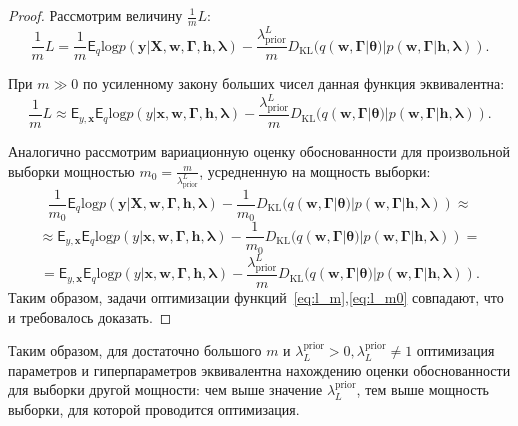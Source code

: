 \begin{proof}
Рассмотрим величину  $\frac{1}{m}L$: \\
\begin{equation}
\label{eq:l_m}
    \frac{1}{m}L = \frac{1}{m}\mathsf{E}_q \text{log}p(\mathbf{y}|\mathbf{X},  \mathbf{w}, \boldsymbol{\Gamma}, \mathbf{h}, \boldsymbol{\lambda})-\frac{\lambda_\text{prior}^L}{m}D_\text{KL}(q(\mathbf{w}, \boldsymbol{\Gamma}|\boldsymbol{\theta})|p(\mathbf{w},\boldsymbol{\Gamma}|\mathbf{h}, \boldsymbol{\lambda})).
\end{equation}

При $m \gg 0$ по усиленному закону больших чисел данная функция эквивалентна:
\[
    \frac{1}{m}L \approx  \mathsf{E}_{y, \mathbf{x}} \mathsf{E}_{q} \text{log}p(y|\mathbf{x}, \mathbf{w}, \boldsymbol{\Gamma}, \mathbf{h}, \boldsymbol{\lambda}) -\frac{\lambda_\text{prior}^L}{m}D_\text{KL}(q(\mathbf{w}, \boldsymbol{\Gamma}|\boldsymbol{\theta})|p(\mathbf{w},\boldsymbol{\Gamma}|\mathbf{h}, \boldsymbol{\lambda})).
\]

Аналогично рассмотрим вариационную оценку обоснованности для произвольной выборки мощностью $m_0 = \frac{m}{\lambda_\text{prior}^L}$, усредненную на мощность выборки:
\begin{equation}
\label{eq:l_m0}
    \frac{1}{m_0}\mathsf{E}_q \text{log}p(\mathbf{y}|\mathbf{X},  \mathbf{w}, \boldsymbol{\Gamma}, \mathbf{h}, \boldsymbol{\lambda})-\frac{1}{m_0}D_\text{KL}(q(\mathbf{w}, \boldsymbol{\Gamma}|\boldsymbol{\theta})|p(\mathbf{w},\boldsymbol{\Gamma}|\mathbf{h}, \boldsymbol{\lambda})) \approx
\end{equation}
\[
\approx  \mathsf{E}_{y, \mathbf{x}} \mathsf{E}_{q} \text{log}p(y|\mathbf{x}, \mathbf{w}, \boldsymbol{\Gamma}, \mathbf{h}, \boldsymbol{\lambda}) -\frac{1}{m_0}D_\text{KL}(q(\mathbf{w}, \boldsymbol{\Gamma}|\boldsymbol{\theta})|p(\mathbf{w},\boldsymbol{\Gamma}|\mathbf{h}, \boldsymbol{\lambda})) = 
\]
\[
= \mathsf{E}_{y, \mathbf{x}} \mathsf{E}_{q} \text{log}p(y|\mathbf{x}, \mathbf{w}, \boldsymbol{\Gamma}, \mathbf{h}, \boldsymbol{\lambda}) -\frac{\lambda_\text{prior}^L}{m}D_\text{KL}(q(\mathbf{w}, \boldsymbol{\Gamma}|\boldsymbol{\theta})|p(\mathbf{w},\boldsymbol{\Gamma}|\mathbf{h}, \boldsymbol{\lambda})).
\]
Таким образом, задачи оптимизации функций~\eqref{eq:l_m},\eqref{eq:l_m0} совпадают, что и требовалось доказать.
\end{proof}
Таким образом, для достаточно большого $m$ и $\lambda^{\text{prior}}_L>0, \lambda^{\text{prior}}_L \neq 1$ оптимизация параметров и гиперпараметров эквивалентна нахождению оценки обоснованности для выборки другой мощности: чем выше значение $ \lambda^{\text{prior}}_L$, тем выше мощность выборки, для которой проводится оптимизация.


